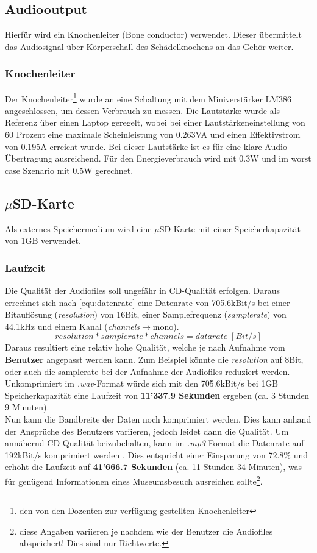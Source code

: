 \subsection{Audiooutput}
Hierfür wird ein Knochenleiter (Bone conductor) verwendet. Dieser übermittelt das Audiosignal über Körperschall des Schädelknochens an das Gehör weiter.
\subsubsection{Knochenleiter}
Der Knochenleiter\footnote{den von den Dozenten zur verfügung gestellten Knochenleiter} wurde an eine Schaltung mit dem Miniverstärker LM386 angeschlossen, um dessen Verbrauch zu messen. Die Lautstärke wurde als Referenz über einen Laptop geregelt, wobei bei einer Lautstärkeneinstellung von 60 Prozent eine maximale Scheinleistung von 0.263VA und einen Effektivstrom von 0.195A erreicht wurde. Bei dieser Lautstärke ist es für eine klare Audio-Übertragung ausreichend. Für den Energieverbrauch wird mit 0.3W und im worst case Szenario mit 0.5W gerechnet.
\newpage
\subsection{$\mu$SD-Karte}
Als externes Speichermedium wird eine $\mu$SD-Karte mit einer Speicherkapazität von 1GB verwendet.
\subsubsection{Laufzeit}
Die Qualität der Audiofiles soll ungefähr in CD-Qualität erfolgen. Daraus errechnet sich nach \ref{equ:datenrate} eine Datenrate von 705.6kBit/s bei einer Bitauflösung (\textit{resolution}) von 16Bit, einer Samplefrequenz (\textit{samplerate}) von 44.1kHz und einem Kanal (\textit{channels}$\rightarrow$mono).
\begin{equation}
resolution * sample rate * channels = data rate\;[Bit/s]
\label{equ:datenrate}
\end{equation}
Daraus resultiert eine relativ hohe Qualität, welche je nach Aufnahme vom \textbf{Benutzer} angepasst werden kann. Zum Beispiel könnte die \textit{resolution} auf 8Bit, oder auch die samplerate bei der Aufnahme der Audiofiles reduziert werden. Unkomprimiert im \textit{.wav}-Format würde sich mit den 705.6kBit/s bei 1GB Speicherkapazität eine Laufzeit von \textbf{11'337.9 Sekunden} ergeben (ca. 3 Stunden 9 Minuten).
\\[0.5cm]
Nun kann die Bandbreite der Daten noch komprimiert werden. Dies kann anhand der Ansprüche des Benutzers variieren, jedoch leidet dann die Qualität. Um annähernd CD-Qualität beizubehalten, kann im \textit{.mp3}-Format die Datenrate auf 192kBit/s komprimiert werden \cite{koepenick.netkeineAngaben}. Dies entspricht einer Einsparung von 72.8\% und erhöht die Laufzeit auf \textbf{41'666.7 Sekunden} (ca. 11 Stunden 34 Minuten), was für genügend Informationen eines Museumsbesuch ausreichen sollte\footnote{diese Angaben variieren je nachdem wie der Benutzer die Audiofiles abspeichert! Dies sind nur Richtwerte.}.
